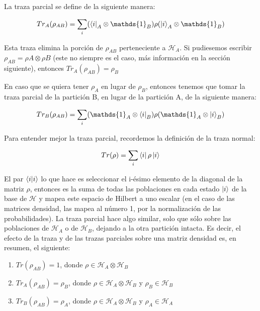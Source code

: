 La traza parcial se define de la siguiente manera:

\begin{equation}
    Tr_A(\rho_{A B}) = \sum\limits_i (\bra{i}_A \otimes \mathds{1}_B) \rho (\ket{i}_A \otimes \mathds{1}_B)
\end{equation}

Esta traza elimina la porción de $\rho_{A B}$ perteneciente a $\mathcal{H}_A$. Si pudiesemos escribir $\rho_{A B} = \rho{A} \otimes \rho{B}$ (este no siempre es el caso, más información en la sección siguiente), entonces $Tr_A(\rho_{A B}) = \rho_B$

En caso que se quiera tener $\rho_A$ en lugar de $\rho_B$, entonces tenemos que tomar la traza parcial de la partición B, en lugar de la partición A, de la siguiente manera:

\begin{equation}
    Tr_B(\rho_{A B}) = \sum\limits_i (\mathds{1}_A \otimes \bra{i}_B) \rho (\mathds{1}_A \otimes \ket{i}_B)
\end{equation}

Para entender mejor la traza parcial, recordemos la definición de la traza normal:

\begin{equation}
    Tr(\rho) = \sum\limits_i \bra{i} \rho \ket{i}
\end{equation}

El par $\bra{i} \ket{i}$ lo que hace es seleccionar el i-ésimo elemento de la diagonal de la matriz $\rho$, entonces es la suma de todas las poblaciones en cada estado $\ket{i}$ de la base de $\mathcal{H}$ y mapea este espacio de Hilbert a uno escalar (en el caso de las matrices densidad, las mapea al número 1, por la normalización de las probabilidades). La traza parcial hace algo similar, solo que sólo sobre las poblaciones de $\mathcal{H}_A$ o de $\mathcal{H}_B$, dejando a la otra partición intacta. Es decir, el efecto de la traza y de las trazas parciales sobre una matriz densidad es, en resumen, el siguiente:

\begin{enumerate}
    \item $Tr(\rho_{A B}) = 1$, donde $\rho \in \mathcal{H}_A \otimes \mathcal{H}_B$
    \item $Tr_A(\rho_{A B}) = \rho_B$, donde $\rho \in \mathcal{H}_A \otimes \mathcal{H}_B$ y $\rho_B \in \mathcal{H}_B$
    \item $Tr_B(\rho_{A B}) = \rho_A$, donde $\rho \in \mathcal{H}_A \otimes \mathcal{H}_B$ y $\rho_A \in \mathcal{H}_A$
\end{enumerate}


